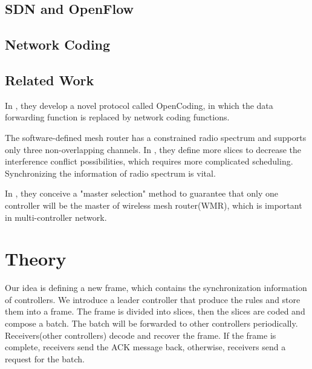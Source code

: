 \documentclass[10pt,conference,final]{IEEEtran}
\begin{document}
	\subsection{SDN and OpenFlow}
	
	\subsection{Network Coding}
	
	
	
	
	\subsection{Related Work}
	
	In \cite{zhu2015towards}, they develop a novel protocol called OpenCoding, in which the data forwarding function is replaced by network coding functions.
	
	The software-defined mesh router has a constrained radio spectrum and supports only three non-overlapping channels. In \cite{huang2015software}, they define more slices to decrease the interference conflict possibilities, which requires more complicated scheduling. Synchronizing the information of radio spectrum is vital.
	
	In \cite{salsano2014controller}, they conceive a "master selection" method to guarantee that only one controller will be the master of wireless mesh router(WMR), which is important in multi-controller network.
	
	\section{Theory}
	
	Our idea is defining a new frame, which contains the synchronization information of controllers. We introduce a leader controller that produce the rules and store them into a frame. The frame is divided into slices, then the slices are coded and compose a batch. The batch will be forwarded to other controllers periodically. Receivers(other controllers) decode and recover the frame. If the frame is complete, receivers send the ACK message back, otherwise, receivers send a request for the batch.
	
\end{document}
